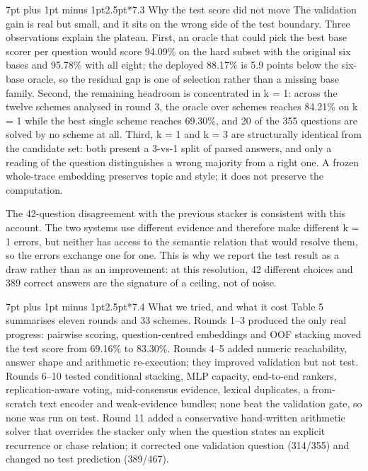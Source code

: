 \documentclass[10pt,a4paper]{article}
\makeatletter
\renewcommand\subsection{\@startsection{subsection}{2}{\z@}%
  {7pt plus 1pt minus 1pt}{2.5pt}{\normalfont\normalsize\bfseries}}
\makeatother
\begin{document}
\subsection*{7.3  Why the test score did not move}
The validation gain is real but small, and it sits on the wrong side of the test boundary. Three observations explain the plateau. First, an oracle that could pick the best base scorer per question would score 94.09\% on the hard subset with the original six bases and 95.78\% with all eight; the deployed 88.17\% is 5.9 points below the six-base oracle, so the residual gap is one of selection rather than a missing base family. Second, the remaining headroom is concentrated in k = 1: across the twelve schemes analysed in round 3, the oracle over schemes reaches 84.21\% on k = 1 while the best single scheme reaches 69.30\%, and 20 of the 355 questions are solved by no scheme at all. Third, k = 1 and k = 3 are structurally identical from the candidate set: both present a 3-vs-1 split of parsed answers, and only a reading of the question distinguishes a wrong majority from a right one. A frozen whole-trace embedding preserves topic and style; it does not preserve the computation.

The 42-question disagreement with the previous stacker is consistent with this account. The two systems use different evidence and therefore make different k = 1 errors, but neither has access to the semantic relation that would resolve them, so the errors exchange one for one. This is why we report the test result as a draw rather than as an improvement: at this resolution, 42 different choices and 389 correct answers are the signature of a ceiling, not of noise.

\subsection*{7.4  What we tried, and what it cost}
Table 5 summarises eleven rounds and 33 schemes. Rounds 1--3 produced the only real progress: pairwise scoring, question-centred embeddings and OOF stacking moved the test score from 69.16\% to 83.30\%. Rounds 4--5 added numeric reachability, answer shape and arithmetic re-execution; they improved validation but not test. Rounds 6--10 tested conditional stacking, MLP capacity, end-to-end rankers, replication-aware voting, mid-consensus evidence, lexical duplicates, a from-scratch text encoder and weak-evidence bundles; none beat the validation gate, so none was run on test. Round 11 added a conservative hand-written arithmetic solver that overrides the stacker only when the question states an explicit recurrence or chase relation; it corrected one validation question (314/355) and changed no test prediction (389/467).
\end{document}
